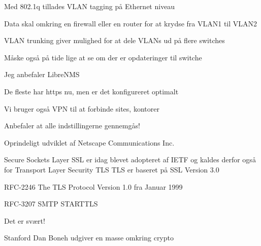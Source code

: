 \documentclass[Screen16to9,17pt]{foils}
\begin{document}


\begin{list1}
\item Med 802.1q tillades VLAN tagging på Ethernet niveau
\item Data skal omkring en firewall eller en router for at krydse fra VLAN1 til VLAN2
\item VLAN trunking giver mulighed for at dele VLANs ud på flere switches
\end{list1}




\begin{list2}
\item Måske også på tide lige at se om der er opdateringer til switche
\item Jeg anbefaler LibreNMS 
\end{list2}




\begin{list2}
\item De fleste har https nu, men er det konfigureret optimalt
\item Vi bruger også VPN til at forbinde sites, kontorer
\item Anbefaler at alle indstillingerne gennemgås!
\end{list2}




\begin{list1}
\item Oprindeligt udviklet af Netscape Communications Inc.
\item Secure Sockets Layer SSL er idag blevet adopteret af IETF og kaldes
derfor også for Transport Layer Security TLS
TLS er baseret på SSL Version 3.0
\item RFC-2246 The TLS Protocol Version 1.0 fra Januar 1999
\item RFC-3207 SMTP STARTTLS
\item Det er svært!
\item Stanford Dan Boneh udgiver en masse omkring crypto\\ 
\end{list1}
\end{document}

